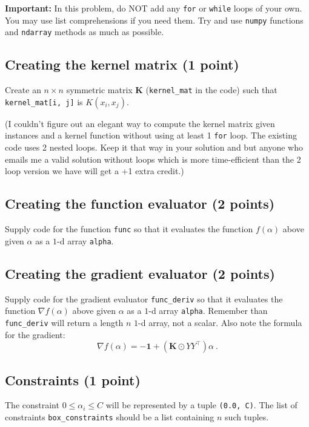 \documentclass{article}
\begin{document}
{\bf Important:} In this problem, do NOT add any {\tt for} or {\tt while} loops of your own. You may use list comprehensions if you need them.
Try and use {\tt numpy} functions and {\tt ndarray} methods as much as possible.

\subsection{Creating the kernel matrix (1 point)}
Create an $n \times n$ symmetric matrix $\mathbf{K}$ ({\tt kernel\_mat} in the code) such that {\tt kernel\_mat[i, j]} is $K(x_i, x_j)$.

(I couldn't figure out an elegant way to compute the kernel matrix given instances and a kernel function without using at least 1 {\tt for}
loop. The existing code uses 2 nested loops. Keep it that way in your solution and but anyone who emails me a
valid solution without loops which is more time-efficient than the 2 loop version we have will get a +1 extra credit.)

\subsection{Creating the function evaluator (2 points)}

Supply code for the function {\tt func} so that it evaluates the function $f(\alpha)$ above given $\alpha$ as a $1$-d array {\tt alpha}.

\subsection{Creating the gradient evaluator (2 points)}

Supply code for the gradient evaluator {\tt func\_deriv} so that it evaluates the function $\nabla f(\alpha)$ above given $\alpha$ as a $1$-d array {\tt alpha}.
Remember than {\tt func\_deriv} will return a length $n$ $1$-d array, not a scalar. Also note the formula for the gradient:
$$
\nabla f(\alpha) = -\mathbf{1} + (\mathbf{K} \odot YY^\top) \alpha \ .
$$

\subsection{Constraints (1 point)}

The constraint $0 \leq \alpha_i \leq C$ will be represented by a tuple {\tt (0.0, C)}. The list of constraints {\tt box\_constraints} should be a list containing
$n$ such tuples.
\end{document}

